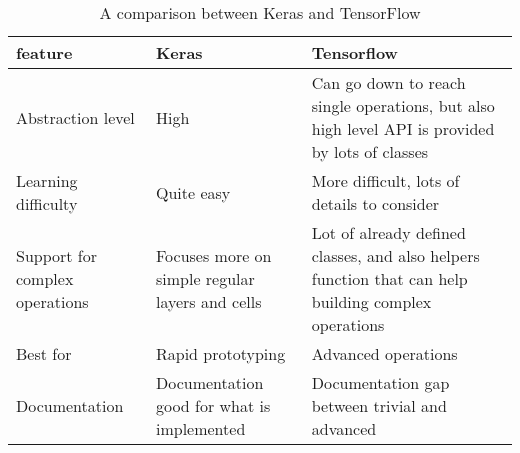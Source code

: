 
\begin{table}
  \begin{tabularx}{\textwidth}{XXX}
    \toprule
    \textbf{feature} & \textbf{Keras} & \textbf{Tensorflow} \\
    \midrule
    Abstraction level & High & Can go down to reach single operations, but also high level API is provided by lots of classes \\
    \midrule
    Learning difficulty & Quite easy & More difficult, lots of details to consider \\
    \midrule
    Support for complex operations & Focuses more on simple regular layers and cells & Lot of already defined classes, and also helpers function that can help building complex operations \\
    \midrule
    Best for & Rapid prototyping & Advanced operations \\
    \midrule
    Documentation & Documentation good for what is implemented & Documentation gap between trivial and advanced \\
    \bottomrule
  \end{tabularx}
  \caption{A comparison between Keras and TensorFlow}\label{tab:kerasVsTf}
\end{table}